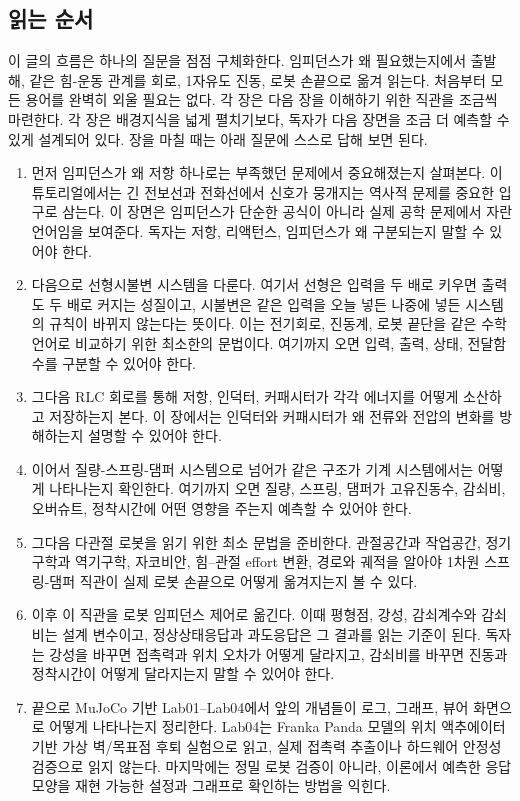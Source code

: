 \subsection{읽는 순서}

이 글의 흐름은 하나의 질문을 점점 구체화한다.
임피던스가 왜 필요했는지에서 출발해, 같은 힘-운동 관계를 회로, 1자유도 진동, 로봇 손끝으로 옮겨 읽는다.
처음부터 모든 용어를 완벽히 외울 필요는 없다.
각 장은 다음 장을 이해하기 위한 직관을 조금씩 마련한다.
각 장은 배경지식을 넓게 펼치기보다, 독자가 다음 장면을 조금 더 예측할 수 있게 설계되어 있다.
장을 마칠 때는 아래 질문에 스스로 답해 보면 된다.

\begin{enumerate}
  \item 먼저 임피던스가 왜 저항 하나로는 부족했던 문제에서 중요해졌는지 살펴본다. 이 튜토리얼에서는 긴 전보선과 전화선에서 신호가 뭉개지는 역사적 문제를 중요한 입구로 삼는다. 이 장면은 임피던스가 단순한 공식이 아니라 실제 공학 문제에서 자란 언어임을 보여준다. 독자는 저항, 리액턴스, 임피던스가 왜 구분되는지 말할 수 있어야 한다.
  \item 다음으로 선형시불변 시스템을 다룬다. 여기서 선형은 입력을 두 배로 키우면 출력도 두 배로 커지는 성질이고, 시불변은 같은 입력을 오늘 넣든 나중에 넣든 시스템의 규칙이 바뀌지 않는다는 뜻이다. 이는 전기회로, 진동계, 로봇 끝단을 같은 수학 언어로 비교하기 위한 최소한의 문법이다. 여기까지 오면 입력, 출력, 상태, 전달함수를 구분할 수 있어야 한다.
  \item 그다음 RLC 회로를 통해 저항, 인덕터, 커패시터가 각각 에너지를 어떻게 소산하고 저장하는지 본다. 이 장에서는 인덕터와 커패시터가 왜 전류와 전압의 변화를 방해하는지 설명할 수 있어야 한다.
  \item 이어서 질량-스프링-댐퍼 시스템으로 넘어가 같은 구조가 기계 시스템에서는 어떻게 나타나는지 확인한다. 여기까지 오면 질량, 스프링, 댐퍼가 고유진동수, 감쇠비, 오버슈트, 정착시간에 어떤 영향을 주는지 예측할 수 있어야 한다.
  \item 그다음 다관절 로봇을 읽기 위한 최소 문법을 준비한다. 관절공간과 작업공간, 정기구학과 역기구학, 자코비안, 힘--관절 effort 변환, 경로와 궤적을 알아야 1차원 스프링-댐퍼 직관이 실제 로봇 손끝으로 어떻게 옮겨지는지 볼 수 있다.
%
  \item 이후 이 직관을 로봇 임피던스 제어로 옮긴다. 이때 평형점, 강성, 감쇠계수와 감쇠비는 설계 변수이고, 정상상태응답과 과도응답은 그 결과를 읽는 기준이 된다. 독자는 강성을 바꾸면 접촉력과 위치 오차가 어떻게 달라지고, 감쇠비를 바꾸면 진동과 정착시간이 어떻게 달라지는지 말할 수 있어야 한다.
  \item 끝으로 MuJoCo 기반 Lab01--Lab04에서 앞의 개념들이 로그, 그래프, 뷰어 화면으로 어떻게 나타나는지 정리한다. Lab04는 Franka Panda 모델의 위치 액추에이터 기반 가상 벽/목표점 후퇴 실험으로 읽고, 실제 접촉력 추출이나 하드웨어 안정성 검증으로 읽지 않는다. 마지막에는 정밀 로봇 검증이 아니라, 이론에서 예측한 응답 모양을 재현 가능한 설정과 그래프로 확인하는 방법을 익힌다.
\end{enumerate}

